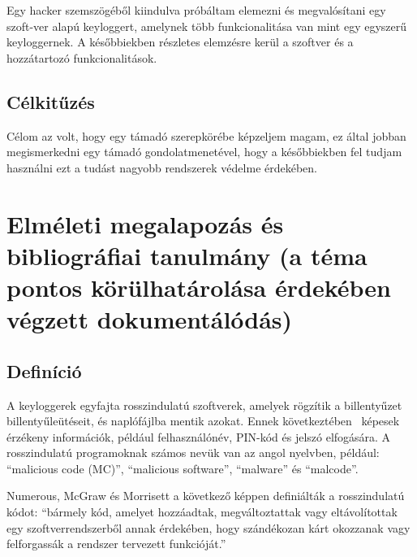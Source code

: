 \documentclass[a4paper, 11pt]{article}
\begin{document}
Egy hacker szemszögéből kiindulva próbáltam elemezni és megvalósítani egy szoft-ver alapú keyloggert, amelynek több funkcionalitása van mint egy egyszerű keyloggernek. A későbbiekben részletes elemzésre kerül a szoftver és a hozzátartozó funkcionalitások.

\subsection{Célkitűzés}
Célom az volt, hogy egy támadó szerepkörébe képzeljem magam, ez által jobban megismerkedni egy támadó gondolatmenetével, hogy a későbbiekben fel tudjam használni ezt a tudást nagyobb rendszerek védelme érdekében.

\section{Elméleti megalapozás és bibliográfiai tanulmány (a téma pontos körülhatárolása érdekében végzett dokumentálódás)}\label{sec:bibl}

\subsection{Definíció}
\parencite{ahmed2014survey} A keyloggerek egyfajta rosszindulatú szoftverek, amelyek rögzítik a billentyűzet billentyűleütéseit, és naplófájlba mentik azokat. Ennek következtében \ képesek érzékeny információk, például felhasználónév, PIN-kód és jelszó elfogására. A rosszindulatú programoknak számos nevük van az angol nyelvben, például: ``malicious code (MC)'', ``malicious software'', ``malware'' és ``malcode''.

Numerous, McGraw és Morrisett a következő képpen definiálták a rosszindulatú kódot: \cite{ahmed2014survey} ``bármely kód, amelyet hozzáadtak, megváltoztattak vagy eltávolítottak egy szoftverrendszerből annak érdekében, hogy szándékozan kárt okozzanak vagy felforgassák a rendszer tervezett funkcióját.''
\end{document}
